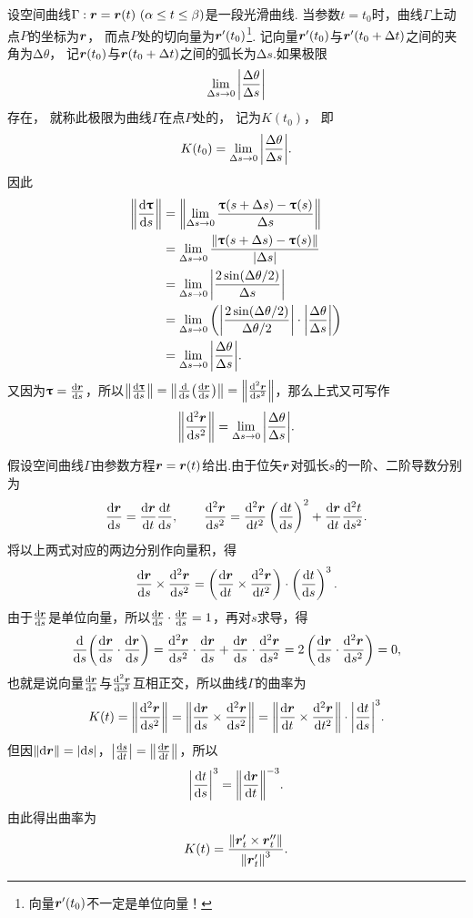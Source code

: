 设空间曲线\(\Gamma: \vb{r} = \vb{r}(t)\ (\alpha \leq t \leq \beta)\)是一段光滑曲线.
当参数\(t = t_0\)时，曲线\(\Gamma\)上动点\(P\)的坐标为\(\boldsymbol{r}\)，
而点\(P\)处的切向量为\(\boldsymbol{r}'(t_0)\)\footnote{向量\(\boldsymbol{r}'(t_0)\)不一定是单位向量！}.
记向量\(\boldsymbol{r}'(t_0)\)与\(\boldsymbol{r}'(t_0+\Delta t)\)之间的夹角为\(\increment\theta\)，
记\(\boldsymbol{r}(t_0)\)与\(\boldsymbol{r}(t_0+\Delta t)\)之间的弧长为\(\increment s\).如果极限\[
	\lim_{\Delta s \to 0} \abs{ \frac{\Delta\theta}{\Delta s} }
\]存在，
就称此极限为曲线\(\Gamma\)在点\(P\)处的，
记为\(K(t_0)\)，
即\[
	K(t_0)
	= \lim_{\Delta s \to 0} \abs{ \frac{\Delta\theta}{\Delta s} }.
\]
因此\begin{align*}
	\norm{ \dv{\boldsymbol{\uptau}}{s} }
	&= \norm{
			\lim_{\Delta s \to 0}
				\frac{\boldsymbol{\uptau}(s+\Delta s) - \boldsymbol{\uptau}(s)}{\Delta s}
		} \\
	&= \lim_{\Delta s \to 0}
		\frac{\norm{\boldsymbol{\uptau}(s+\Delta s) - \boldsymbol{\uptau}(s)}}{\abs{\Delta s}} \\
	&= \lim_{\Delta s \to 0}
		\abs{ \frac{2 \sin(\Delta\theta / 2)}{\Delta s} } \\
	&= \lim_{\Delta s \to 0}
		\left(
			\abs{ \frac{2 \sin(\Delta\theta / 2)}{\Delta\theta/2} }
			\cdot \abs{ \frac{\Delta\theta}{\Delta s} }
		\right) \\
	&= \lim_{\Delta s \to 0}
		\abs{ \frac{\Delta\theta}{\Delta s} }.
\end{align*}
又因为\(\boldsymbol{\uptau} = \dv{\boldsymbol{r}}{s}\)，所以\(\norm{ \dv{\boldsymbol{\uptau}}{s} } = \norm{ \dv{s}( \dv{\boldsymbol{r}}{s} ) } = \norm{ \dv[2]{\boldsymbol{r}}{s} }\)，那么上式又可写作\begin{equation}
\norm{ \dv[2]{\boldsymbol{r}}{s} }
= \lim_{\Delta s \to 0} \abs{ \frac{\Delta\theta}{\Delta s} }.
\end{equation}

假设空间曲线\(\Gamma\)由参数方程\(\boldsymbol{r} = \boldsymbol{r}(t)\)给出.由于位矢\(\boldsymbol{r}\)对弧长\(s\)的一阶、二阶导数分别为\[
\dv{\boldsymbol{r}}{s} = \dv{\boldsymbol{r}}{t} \dv{t}{s},
\qquad
\dv[2]{\boldsymbol{r}}{s} = \dv[2]{\boldsymbol{r}}{t} \left(\dv{t}{s}\right)^2 + \dv{\boldsymbol{r}}{t} \dv[2]{t}{s}.
\]将以上两式对应的两边分别作向量积，得\[
\dv{\boldsymbol{r}}{s} \times \dv[2]{\boldsymbol{r}}{s}
= \left(\dv{\boldsymbol{r}}{t} \times \dv[2]{\boldsymbol{r}}{t}\right) \cdot \left(\dv{t}{s}\right)^3.
\]由于\(\dv{\boldsymbol{r}}{s}\)是单位向量，所以\(\dv{\boldsymbol{r}}{s} \cdot \dv{\boldsymbol{r}}{s} = 1\)，再对\(s\)求导，得\[
\dv{s}( \dv{\boldsymbol{r}}{s} \cdot \dv{\boldsymbol{r}}{s} )
= \dv[2]{\boldsymbol{r}}{s} \cdot \dv{\boldsymbol{r}}{s} + \dv{\boldsymbol{r}}{s} \cdot \dv[2]{\boldsymbol{r}}{s}
= 2 \left( \dv{\boldsymbol{r}}{s} \cdot \dv[2]{\boldsymbol{r}}{s} \right)
= 0,
\]也就是说向量\(\dv{\boldsymbol{r}}{s}\)与\(\dv[2]{\boldsymbol{r}}{s}\)互相正交，所以曲线\(\Gamma\)的曲率为\[
K(t) = \norm{ \dv[2]{\boldsymbol{r}}{s} }
= \norm{ \dv{\boldsymbol{r}}{s} \times \dv[2]{\boldsymbol{r}}{s} }
= \norm{ \dv{\boldsymbol{r}}{t} \times \dv[2]{\boldsymbol{r}}{t} } \cdot \abs{ \dv{t}{s} }^3.
\]但因\(\norm{ \dd{\boldsymbol{r}} } = \abs{ \dd{s} }\)，\(\abs{ \dv{s}{t} } = \norm{ \dv{\boldsymbol{r}}{t} }\)，所以\[
\abs{ \dv{t}{s} }^3 = \norm{ \dv{\boldsymbol{r}}{t} }^{-3}.
\]由此得出曲率为\begin{equation}
K(t) = \frac{ \norm{ \boldsymbol{r}'_t \times \boldsymbol{r}''_t } }{ \norm{ \boldsymbol{r}'_t }^3 }.
\end{equation}


